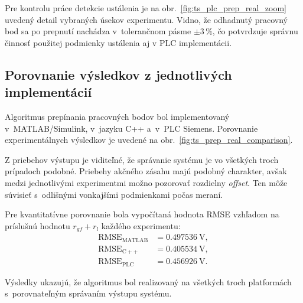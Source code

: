Pre kontrolu práce detekcie ustálenia je na obr.~\ref{fig:ts_plc_prep_real_zoom}
uvedený detail vybraných úsekov experimentu. Vidno, že odhadnutý pracovný bod
sa po prepnutí nachádza v~tolerančnom pásme $\pm 3\,\%$, čo potvrdzuje správnu
činnosť použitej podmienky ustálenia aj v PLC implementácii.




\subsection{Porovnanie výsledkov z jednotlivých implementácií}
\label{sec:prep_implementation_comparison}

Algoritmus prepínania pracovných bodov bol implementovaný v~MATLAB/Simulink, v~jazyku C++ a~v~PLC Siemens. Porovnanie experimentálnych
výsledkov je uvedené na obr.~\ref{fig:ts_prep_real_comparison}.



Z priebehov výstupu je viditeľné, že správanie systému je vo všetkých troch
prípadoch podobné. Priebehy akčného zásahu majú podobný charakter, avšak
medzi jednotlivými experimentmi možno pozorovať rozdielny \textit{offset}. Ten môže
súvisieť s~odlišnými vonkajšími podmienkami počas meraní.

Pre kvantitatívne porovnanie bola vypočítaná hodnota RMSE vzhľadom na príslušnú
hodnotu $r_{gf}+r_l$ každého experimentu:
\begin{align}
    \mathrm{RMSE}_{\mathrm{MATLAB}} &= 0.497536~\mathrm{V}, \\
    \mathrm{RMSE}_{\mathrm{C++}} &= 0.405534~\mathrm{V}, \\
    \mathrm{RMSE}_{\mathrm{PLC}} &= 0.456926~\mathrm{V}.
\end{align}

Výsledky ukazujú, že algoritmus bol realizovaný na všetkých troch platformách
s~porovnateľným správaním výstupu systému.



\clearpage